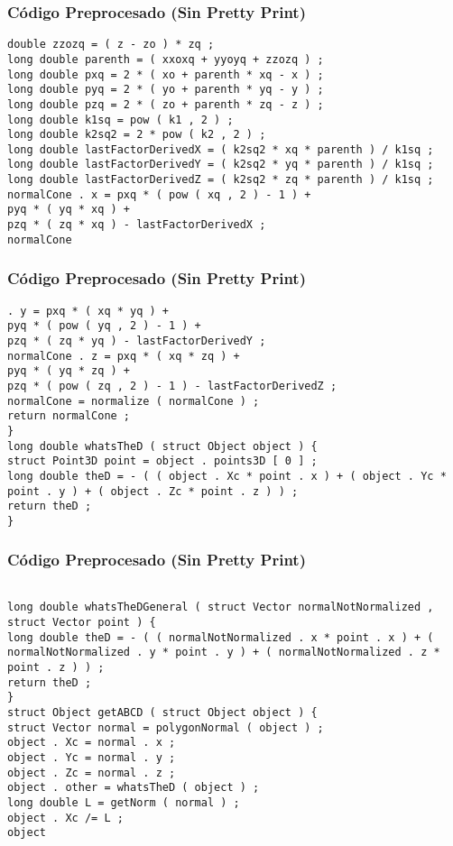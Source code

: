 \documentclass{beamer}
\begin{document}
\begin{frame}[fragile]
\frametitle{C\'odigo Preprocesado (Sin Pretty Print)}
\begin{lstlisting}[style=CStyle]
double zzozq = ( z - zo ) * zq ; 
long double parenth = ( xxoxq + yyoyq + zzozq ) ; 
long double pxq = 2 * ( xo + parenth * xq - x ) ; 
long double pyq = 2 * ( yo + parenth * yq - y ) ; 
long double pzq = 2 * ( zo + parenth * zq - z ) ; 
long double k1sq = pow ( k1 , 2 ) ; 
long double k2sq2 = 2 * pow ( k2 , 2 ) ; 
long double lastFactorDerivedX = ( k2sq2 * xq * parenth ) / k1sq ; 
long double lastFactorDerivedY = ( k2sq2 * yq * parenth ) / k1sq ; 
long double lastFactorDerivedZ = ( k2sq2 * zq * parenth ) / k1sq ; 
normalCone . x = pxq * ( pow ( xq , 2 ) - 1 ) + 
pyq * ( yq * xq ) + 
pzq * ( zq * xq ) - lastFactorDerivedX ; 
normalCone \end{lstlisting}
\end{frame}
\begin{frame}[fragile]
\frametitle{C\'odigo Preprocesado (Sin Pretty Print)}
\begin{lstlisting}[style=CStyle]
. y = pxq * ( xq * yq ) + 
pyq * ( pow ( yq , 2 ) - 1 ) + 
pzq * ( zq * yq ) - lastFactorDerivedY ; 
normalCone . z = pxq * ( xq * zq ) + 
pyq * ( yq * zq ) + 
pzq * ( pow ( zq , 2 ) - 1 ) - lastFactorDerivedZ ; 
normalCone = normalize ( normalCone ) ; 
return normalCone ; 
} 
long double whatsTheD ( struct Object object ) { 
struct Point3D point = object . points3D [ 0 ] ; 
long double theD = - ( ( object . Xc * point . x ) + ( object . Yc * point . y ) + ( object . Zc * point . z ) ) ; 
return theD ; 
} \end{lstlisting}
\end{frame}
\begin{frame}[fragile]
\frametitle{C\'odigo Preprocesado (Sin Pretty Print)}
\begin{lstlisting}[style=CStyle]

long double whatsTheDGeneral ( struct Vector normalNotNormalized , struct Vector point ) { 
long double theD = - ( ( normalNotNormalized . x * point . x ) + ( normalNotNormalized . y * point . y ) + ( normalNotNormalized . z * point . z ) ) ; 
return theD ; 
} 
struct Object getABCD ( struct Object object ) { 
struct Vector normal = polygonNormal ( object ) ; 
object . Xc = normal . x ; 
object . Yc = normal . y ; 
object . Zc = normal . z ; 
object . other = whatsTheD ( object ) ; 
long double L = getNorm ( normal ) ; 
object . Xc /= L ; 
object \end{lstlisting}
\end{frame}
\end{document}
